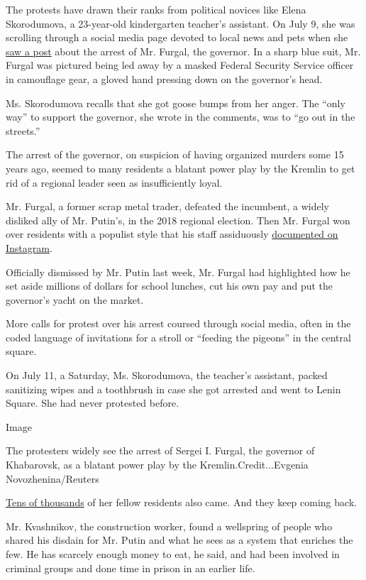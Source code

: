 The protests have drawn their ranks from political novices like Elena
Skorodumova, a 23-year-old kindergarten teacher's assistant. On July 9,
she was scrolling through a social media page devoted to local news and
pets when she
\href{https://vk.com/t_khabarovsk?w=wall-33988878_1469520}{saw a post}
about the arrest of Mr. Furgal, the governor. In a sharp blue suit, Mr.
Furgal was pictured being led away by a masked Federal Security Service
officer in camouflage gear, a gloved hand pressing down on the
governor's head.

Ms. Skorodumova recalls that she got goose bumps from her anger. The
``only way'' to support the governor, she wrote in the comments, was to
``go out in the streets.''

The arrest of the governor, on suspicion of having organized murders
some 15 years ago, seemed to many residents a blatant power play by the
Kremlin to get rid of a regional leader seen as insufficiently loyal.

Mr. Furgal, a former scrap metal trader, defeated the incumbent, a
widely disliked ally of Mr. Putin's, in the 2018 regional election. Then
Mr. Furgal won over residents with a populist style that his staff
assiduously \href{https://www.instagram.com/s.furgal/}{documented on
Instagram}.

Officially dismissed by Mr. Putin last week, Mr. Furgal had highlighted
how he set aside millions of dollars for school lunches, cut his own pay
and put the governor's yacht on the market.

More calls for protest over his arrest coursed through social media,
often in the coded language of invitations for a stroll or ``feeding the
pigeons'' in the central square.

On July 11, a Saturday, Ms. Skorodumova, the teacher's assistant, packed
sanitizing wipes and a toothbrush in case she got arrested and went to
Lenin Square. She had never protested before.

Image

The protesters widely see the arrest of Sergei I. Furgal, the governor
of Khabarovsk, as a blatant power play by the Kremlin.Credit...Evgenia
Novozhenina/Reuters

\href{https://www.nytimes.com/2020/07/10/world/europe/russian-governor-arrested-murders.html}{Tens
of thousands} of her fellow residents also came. And they keep coming
back.

Mr. Kvashnikov, the construction worker, found a wellspring of people
who shared his disdain for Mr. Putin and what he sees as a system that
enriches the few. He has scarcely enough money to eat, he said, and had
been involved in criminal groups and done time in prison in an earlier
life.


